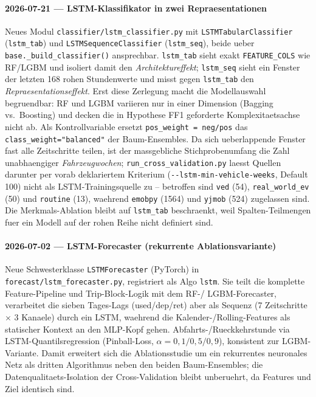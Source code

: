 \paragraph{2026-07-21 --- LSTM-Klassifikator in zwei Repraesentationen}
Neues Modul \texttt{classifier/lstm\_classifier.py} mit
\texttt{LSTMTabularClassifier} (\texttt{lstm\_tab}) und
\texttt{LSTMSequenceClassifier} (\texttt{lstm\_seq}), beide ueber
\texttt{base.\_build\_classifier()} ansprechbar. \texttt{lstm\_tab} sieht exakt
\texttt{FEATURE\_COLS} wie RF/LGBM und isoliert damit den
\emph{Architektureffekt}; \texttt{lstm\_seq} sieht ein Fenster der letzten
168 rohen Stundenwerte und misst gegen \texttt{lstm\_tab} den
\emph{Repraesentationseffekt}. Erst diese Zerlegung macht die
Modellauswahl begruendbar: RF und LGBM variieren nur in einer Dimension
(Bagging vs.\ Boosting) und decken die in Hypothese FF1 geforderte
Komplexitaetsachse nicht ab. Als Kontrollvariable ersetzt
\texttt{pos\_weight = neg/pos} das \texttt{class\_weight="balanced"} der
Baum-Ensembles. Da sich ueberlappende Fenster fast alle Zeitschritte teilen,
ist der massgebliche Stichprobenumfang die Zahl unabhaengiger
\emph{Fahrzeugwochen}; \texttt{run\_cross\_validation.py} laesst Quellen
darunter per vorab deklariertem Kriterium
(\texttt{-{}-lstm-min-vehicle-weeks}, Default 100) nicht als LSTM-Trainingsquelle
zu -- betroffen sind \texttt{ved} (54), \texttt{real\_world\_ev} (50) und
\texttt{routine} (13), waehrend \texttt{emobpy} (1564) und \texttt{yjmob} (524)
zugelassen sind. Die Merkmals-Ablation bleibt auf \texttt{lstm\_tab}
beschraenkt, weil Spalten-Teilmengen fuer ein Modell auf der rohen Reihe
nicht definiert sind.

\paragraph{2026-07-02 --- LSTM-Forecaster (rekurrente Ablationsvariante)}
Neue Schwesterklasse \texttt{LSTMForecaster} (PyTorch) in
\texttt{forecast/lstm\_forecaster.py}, registriert als Algo \texttt{lstm}.
Sie teilt die komplette Feature-Pipeline und Trip-Block-Logik mit dem RF-/
LGBM-Forecaster, verarbeitet die sieben Tages-Lags (used/dep/ret) aber als
Sequenz (7 Zeitschritte $\times$ 3 Kanaele) durch ein LSTM, waehrend die
Kalender-/Rolling-Features als statischer Kontext an den MLP-Kopf gehen.
Abfahrts-/Rueckkehrstunde via LSTM-Quantilsregression (Pinball-Loss,
$\alpha=0{,}1/0{,}5/0{,}9$), konsistent zur LGBM-Variante. Damit erweitert
sich die Ablationsstudie um ein rekurrentes neuronales Netz als dritten
Algorithmus neben den beiden Baum-Ensembles; die Datenqualitaets-Isolation
der Cross-Validation bleibt unberuehrt, da Features und Ziel identisch sind.

